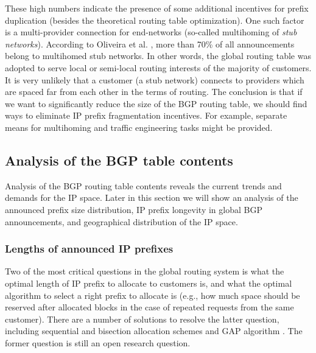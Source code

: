 These high numbers indicate the presence of some additional incentives for
prefix duplication (besides the theoretical routing table optimization). One
such factor is a multi-provider connection for end-networks (so-called
multihoming of \emph{stub networks}). According to Oliveira et al.
\cite{Oliveira:2007:Observing-the-evolution}, more than 70\% of all
announcements belong to multihomed stub networks. In other words, the global
routing table was adopted to serve local or semi-local routing interests of
the majority of customers. It is very unlikely that a customer (a stub
network) connects to providers which are spaced far from each other in the
terms of routing. The conclusion is that if we want to significantly reduce
the size of the BGP routing table, we should find ways to eliminate IP prefix
fragmentation incentives. For example, separate means for multihoming and
traffic engineering tasks might be provided.

\subsection{Analysis of the BGP table contents}

Analysis of the BGP routing table contents reveals the current trends and
demands for the IP space. Later in this section we will show an analysis of
the announced prefix size distribution, IP prefix longevity in global BGP
announcements, and geographical distribution of the IP space.

\subsubsection{Lengths of announced IP prefixes}

Two of the most critical questions in the global routing system is what the
optimal length of IP prefix to allocate to customers is, and what the optimal
algorithm to select a right prefix to allocate is (e.g., how much space should
be reserved after allocated blocks in the case of repeated requests from
the same customer). There are a number of solutions to resolve the latter
question, including sequential and bisection allocation schemes and GAP
algorithm \cite{Wang:2007:Reduce-IP-Address}. The former question is still
an open research question.

